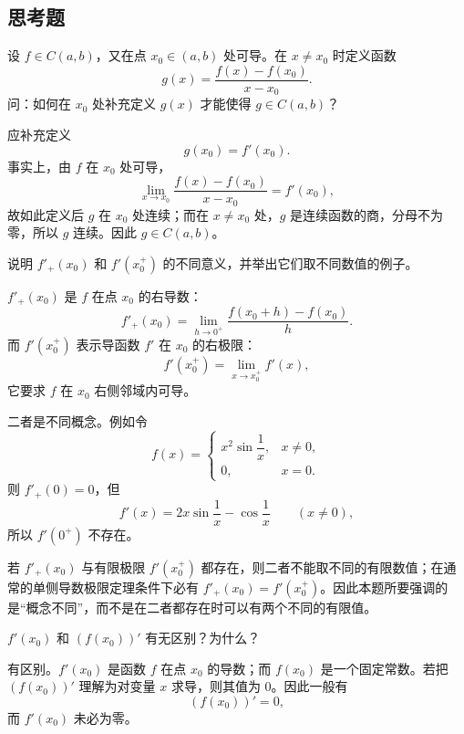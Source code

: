 \subsection{思考题}

\begin{xthought}[1]
设 $f\in C(a,b)$，又在点 $x_0\in(a,b)$ 处可导。在 $x\ne x_0$ 时定义函数
  \[
    g(x)=\frac{f(x)-f(x_0)}{x-x_0}.
  \]
  问：如何在 $x_0$ 处补充定义 $g(x)$ 才能使得 $g\in C(a,b)$？
\end{xthought}
\begin{xsolution}
应补充定义
\[
  g(x_0)=f'(x_0).
\]
事实上，由 $f$ 在 $x_0$ 处可导，
\[
  \lim_{x\to x_0}\frac{f(x)-f(x_0)}{x-x_0}=f'(x_0),
\]
故如此定义后 $g$ 在 $x_0$ 处连续；而在 $x\ne x_0$ 处，$g$ 是连续函数的商，分母不为零，所以 $g$ 连续。因此 $g\in C(a,b)$。
\end{xsolution}


\begin{xthought}[2]
说明 $f'_+(x_0)$ 和 $f'(x_0^+)$ 的不同意义，并举出它们取不同数值的例子。
\end{xthought}
\begin{xsolution}
$f'_+(x_0)$ 是 $f$ 在点 $x_0$ 的右导数：
\[
  f'_+(x_0)=\lim_{h\to0^+}\frac{f(x_0+h)-f(x_0)}h.
\]
而 $f'(x_0^+)$ 表示导函数 $f'$ 在 $x_0$ 的右极限：
\[
  f'(x_0^+)=\lim_{x\to x_0^+}f'(x),
\]
它要求 $f$ 在 $x_0$ 右侧邻域内可导。

二者是不同概念。例如令
\[
  f(x)=
  \begin{cases}
    x^2\sin\dfrac1x,&x\ne0,\\
    0,&x=0.
  \end{cases}
\]
则 $f'_+(0)=0$，但
\[
  f'(x)=2x\sin\frac1x-\cos\frac1x\qquad(x\ne0),
\]
所以 $f'(0^+)$ 不存在。

若 $f'_+(x_0)$ 与有限极限 $f'(x_0^+)$ 都存在，则二者不能取不同的有限数值；在通常的单侧导数极限定理条件下必有 $f'_+(x_0)=f'(x_0^+)$。因此本题所要强调的是“概念不同”，而不是在二者都存在时可以有两个不同的有限值。
\end{xsolution}


\begin{xthought}[3]
$f'(x_0)$ 和 $(f(x_0))'$ 有无区别？为什么？
\end{xthought}
\begin{xsolution}
有区别。$f'(x_0)$ 是函数 $f$ 在点 $x_0$ 的导数；而 $f(x_0)$ 是一个固定常数。若把 $(f(x_0))'$ 理解为对变量 $x$ 求导，则其值为 $0$。因此一般有
\[
  (f(x_0))'=0,
\]
而 $f'(x_0)$ 未必为零。
\end{xsolution}



